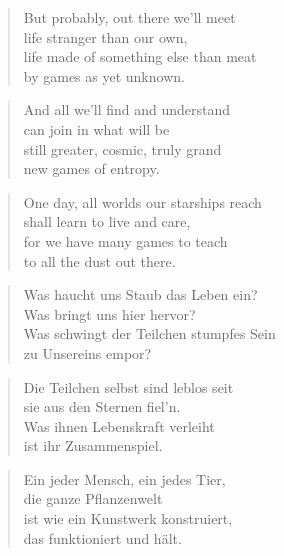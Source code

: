 \documentclass[10pt,a4paper]{article}
\begin{document}
\begin{paracol}{2}
\begin{verse}
But probably, out there we’ll meet\\
life stranger than our own,\\
life made of something else than meat\\
by games as yet unknown.
\end{verse}

\begin{verse}
And all we’ll find and understand\\
can join in what will be\\
still greater, cosmic, truly grand\\
new games of entropy.
\end{verse}

\begin{verse}
One day, all worlds our starships reach\\
shall learn to live and care,\\
for we have many games to teach\\
to all the dust out there.
\end{verse}

\switchcolumn



\begin{verse}
Was haucht uns Staub das Leben ein? \\
Was bringt uns hier hervor? \\
Was schwingt der Teilchen stumpfes Sein \\
zu Unsereins empor? \\
\end{verse}

\begin{verse}
Die Teilchen selbst sind leblos seit \\
sie aus den Sternen fiel’n. \\
Was ihnen Lebenskraft verleiht \\
ist ihr Zusammenspiel. \\
\end{verse}

\begin{verse}
Ein jeder Mensch, ein jedes Tier, \\
die ganze Pflanzenwelt \\
ist wie ein Kunstwerk konstruiert, \\
das funktioniert und hält. \\
\end{verse}


\end{paracol}
\end{document}
